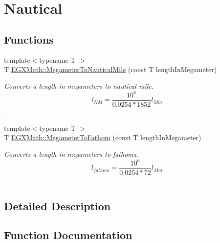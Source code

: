 \hypertarget{group___e_g_x_math-_conversions-_length_conversions-_s_i-_megameter-_nautical}{}\section{Nautical}
\label{group___e_g_x_math-_conversions-_length_conversions-_s_i-_megameter-_nautical}
\subsection*{Functions}
\begin{DoxyCompactItemize}
\item 
{\footnotesize template$<$typename T $>$ }\\T \mbox{\hyperlink{group___e_g_x_math-_conversions-_length_conversions-_s_i-_megameter-_nautical_ga483b575b1654e1d0f6ea1fac63b5f54e}{E\+G\+X\+Math\+::\+Megameter\+To\+Nautical\+Mile}} (const T length\+In\+Megameter)
\begin{DoxyCompactList}\small\item\em Converts a length in megameters to nautical mile. \[ l_{NM}= \frac{10^{6}}{0.0254 * 1852} l_{Mm} \]. \end{DoxyCompactList}\item 
{\footnotesize template$<$typename T $>$ }\\T \mbox{\hyperlink{group___e_g_x_math-_conversions-_length_conversions-_s_i-_megameter-_nautical_ga7149d3c252ab9459f8caad7b054f0601}{E\+G\+X\+Math\+::\+Megameter\+To\+Fathom}} (const T length\+In\+Megameter)
\begin{DoxyCompactList}\small\item\em Converts a length in megameters to fathoms. \[ l_{fathom}= \frac{10^{6}}{0.0254 * 72} l_{Mm} \]. \end{DoxyCompactList}\end{DoxyCompactItemize}


\subsection{Detailed Description}


\subsection{Function Documentation}
\mbox{\label{group___e_g_x_math-_conversions-_length_conversions-_s_i-_megameter-_nautical_ga7149d3c252ab9459f8caad7b054f0601}} 
